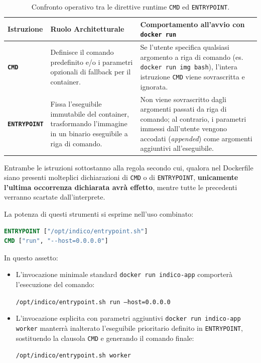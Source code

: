 \documentclass[11pt, a4paper]{article}
\begin{document}
\begin{table}[H]
    \centering
    \small
    \begin{tabularx}{\textwidth}{p{3cm} X X}
        \toprule
        \textbf{Istruzione} & \textbf{Ruolo Architetturale} & \textbf{Comportamento all'avvio con \texttt{docker run}} \\
        \midrule
        \textbf{\texttt{CMD}} & Definisce il comando predefinito e/o i parametri opzionali di fallback per il container. & Se l'utente specifica qualsiasi argomento a riga di comando (es. \texttt{docker run img bash}), l'intera istruzione \texttt{CMD} viene sovrascritta e ignorata. \\
        \midrule
        \textbf{\texttt{ENTRYPOINT}} & Fissa l'eseguibile immutabile del container, trasformando l'immagine in un binario eseguibile a riga di comando. & Non viene sovrascritto dagli argomenti passati da riga di comando; al contrario, i parametri immessi dall'utente vengono accodati (\emph{appended}) come argomenti aggiuntivi all'eseguibile. \\
        \bottomrule
    \end{tabularx}
    \caption{Confronto operativo tra le direttive runtime \texttt{CMD} ed \texttt{ENTRYPOINT}.}
    \label{tab:cmd_vs_entrypoint}
\end{table}

Entrambe le istruzioni sottostanno alla regola secondo cui, qualora nel Dockerfile siano presenti molteplici dichiarazioni di \texttt{CMD} o di \texttt{ENTRYPOINT}, \textbf{unicamente l'ultima occorrenza dichiarata avrà effetto}, mentre tutte le precedenti verranno scartate dall'interprete.

La potenza di questi strumenti si esprime nell'uso combinato:
\begin{lstlisting}[language=dockerfile]
ENTRYPOINT ["/opt/indico/entrypoint.sh"]
CMD ["run", "--host=0.0.0.0"]
\end{lstlisting}
In questo assetto:
\begin{itemize}
    \item L'invocazione minimale standard \texttt{docker run indico-app} comporterà l'esecuzione del comando:
\begin{center}
    \texttt{/opt/indico/entrypoint.sh run --host=0.0.0.0}
\end{center}
    \item L'invocazione esplicita con parametri aggiuntivi \texttt{docker run indico-app worker} manterrà inalterato l'eseguibile prioritario definito in \texttt{ENTRYPOINT}, sostituendo la clausola \texttt{CMD} e generando il comando finale:
\begin{center}
    \texttt{/opt/indico/entrypoint.sh worker}
\end{center}
\end{itemize}
\end{document}
